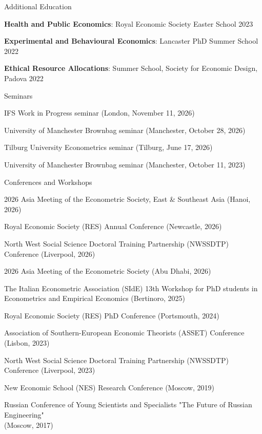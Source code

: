 \documentclass{resume} %
\begin{document}
\begin{rSection}{Additional Education} 
\item \textbf{Health and Public Economics}: Royal Economic Society Easter School 2023 
\item \textbf{Experimental and Behavioural Economics}: Lancaster PhD Summer School 2022
\item \textbf{Ethical Resource Allocations}: Summer School, Society for Economic Design, Padova 2022
\end{rSection}

\begin{rSection}{Seminars} 
\item IFS Work in Progress seminar (London, November 11, 2026) 
\item University of Manchester Brownbag seminar (Manchester, October 28, 2026) 
\item Tilburg University Econometrics seminar (Tilburg, June 17, 2026)
\item University of Manchester Brownbag seminar (Manchester, October 11, 2023) 

\end{rSection}


\begin{rSection}{Conferences and Workshops} 
\item 2026 Asia Meeting of the Econometric Society, East \& Southeast Asia (Hanoi, 2026) 
\item Royal Economic Society (RES) Annual Conference (Newcastle, 2026) 
\item North West Social Science Doctoral Training Partnership (NWSSDTP) Conference (Liverpool, 2026) 
\item 2026 Asia Meeting of the Econometric Society (Abu Dhabi, 2026)
\item The Italian Econometric Association (SIdE) 13th Workshop for PhD students in Econometrics and Empirical Economics (Bertinoro, 2025)
\item Royal Economic Society (RES) PhD Conference (Portsmouth, 2024)
\item Association of Southern-European Economic Theorists (ASSET) Conference (Lisbon, 2023)
\item North West Social Science Doctoral Training Partnership (NWSSDTP) Conference (Liverpool, 2023) 
\item New Economic School (NES) Research Conference (Moscow, 2019)
\item Russian Conference of Young Scientists and Specialists "The Future of Russian Engineering" \\
(Moscow, 2017) 

\end{rSection}
\end{document}
